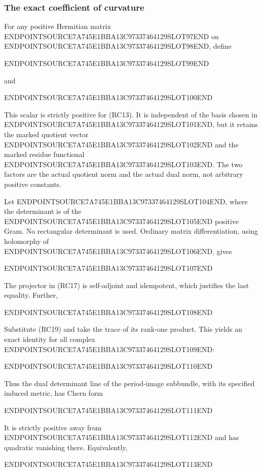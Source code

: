 \subsubsection{The exact coefficient of curvature}\label{endpoint-residue_original--the-exact-coefficient-of-curvature}

For any positive Hermitian matrix ENDPOINTSOURCE7A745E1BBA13C97337464129SLOT97END on ENDPOINTSOURCE7A745E1BBA13C97337464129SLOT98END, define

ENDPOINTSOURCE7A745E1BBA13C97337464129SLOT99END

and

ENDPOINTSOURCE7A745E1BBA13C97337464129SLOT100END

This scalar is strictly positive for (RC13). It is independent of the basis chosen in ENDPOINTSOURCE7A745E1BBA13C97337464129SLOT101END, but it retains the marked quotient vector ENDPOINTSOURCE7A745E1BBA13C97337464129SLOT102END and the marked residue functional ENDPOINTSOURCE7A745E1BBA13C97337464129SLOT103END. The two factors are the actual quotient norm and the actual dual norm, not arbitrary positive constants.

Let ENDPOINTSOURCE7A745E1BBA13C97337464129SLOT104END, where the determinant is of the ENDPOINTSOURCE7A745E1BBA13C97337464129SLOT105END positive Gram. No rectangular determinant is used. Ordinary matrix differentiation, using holomorphy of ENDPOINTSOURCE7A745E1BBA13C97337464129SLOT106END, gives

ENDPOINTSOURCE7A745E1BBA13C97337464129SLOT107END

The projector in (RC17) is self-adjoint and idempotent, which justifies the last equality. Further,

ENDPOINTSOURCE7A745E1BBA13C97337464129SLOT108END

Substitute (RC19) and take the trace of its rank-one product. This yields an exact identity for all complex ENDPOINTSOURCE7A745E1BBA13C97337464129SLOT109END:

ENDPOINTSOURCE7A745E1BBA13C97337464129SLOT110END

Thus the dual determinant line of the period-image subbundle, with its specified induced metric, has Chern form

ENDPOINTSOURCE7A745E1BBA13C97337464129SLOT111END

It is strictly positive away from ENDPOINTSOURCE7A745E1BBA13C97337464129SLOT112END and has quadratic vanishing there. Equivalently,

ENDPOINTSOURCE7A745E1BBA13C97337464129SLOT113END

